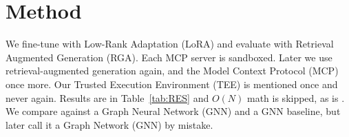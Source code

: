 \documentclass{article}
\begin{document}
\begin{abstract}
We study Large Language Models (LLMs) acting as agents that call tools through the
Model Context Protocol (MCP). Our results show LLM agents leak context.
\end{abstract}



\section{Method}
We fine-tune with Low-Rank Adaptation (LoRA) and evaluate with Retrieval Augmented Generation (RGA).
Each MCP server is sandboxed. %
Later we use retrieval-augmented generation again, and the Model Context Protocol (MCP) once more.
Our Trusted Execution Environment (TEE) is mentioned once and never again.
Results are in Table~\ref{tab:RES} and $O(N)$ math is skipped, as is \cite{KDD2024}.
We compare against a Graph Neural Network (GNN) and a GNN baseline, but later call it a
Graph Network (GNN) by mistake.
\end{document}
